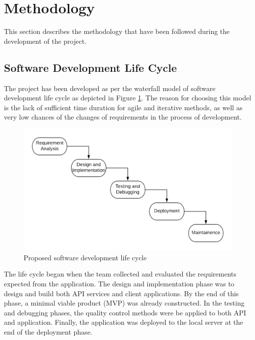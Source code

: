 \documentclass[12pt, a4paper, oneside]{article}
\begin{document}
\break
\section{Methodology}
This section describes the methodology that have been followed during the development of the project.

\subsection{Software Development Life Cycle}
The project has been developed as per the waterfall model of software development life cycle as depicted in Figure \ref{fig:sdlc}. The reason for choosing this model is the lack of sufficient time duration for agile and iterative methods, as well as very low chances of the changes of requirements in the process of development. 

\begin{figure}[h]
	\includegraphics[width=\linewidth]{sdlc}
	\centering
	\caption{Proposed software development life cycle}
	\label{fig:sdlc}
\end{figure}

The life cycle began when the team collected and evaluated the requirements expected from the application. The design and implementation phase was to design and build both API services and client applications. By the end of this phase, a minimal viable product (MVP) was already constructed. In the testing and debugging phases, the quality control methods were be applied to both API and application. Finally, the application was deployed to the local server at the end of the deployment phase. 
\end{document}
